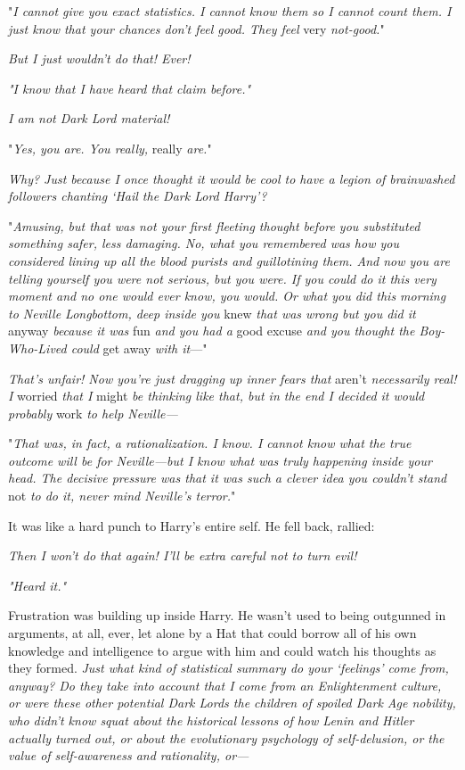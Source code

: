 "\emph{I cannot give you exact statistics. I cannot know them so I cannot count
them. I just know that your chances don't feel good. They feel} very \emph{
not-good.}"

\emph{But I just wouldn't do that! Ever!}

\emph{"I know that I have heard that claim before."}

\emph{I am not Dark Lord material!}

"\emph{Yes, you are. You really,} really \emph{are.}"

\emph{Why? Just because I once thought it would be cool to have a legion of
brainwashed followers chanting `Hail the Dark Lord Harry'?}

"\emph{Amusing, but that was not your first fleeting thought before you
substituted something safer, less damaging. No, what you remembered was how you
considered lining up all the blood purists and guillotining them. And now you
are telling yourself you were not serious, but you were. If you could do it
this very moment and no one would ever know, you would. Or what you did this
morning to Neville Longbottom, deep inside you} knew \emph{that was wrong but
you did it} anyway \emph{because it was} fun \emph{and you had a} good
excuse \emph{and you thought the Boy-Who-Lived could} get away \emph{with
it}\mbox{---}"

\emph{That's unfair! Now you're just dragging up inner fears that} aren't \emph{
necessarily real! I} worried \emph{that I} might \emph{be thinking like that,
but in the end I decided it would probably} work \emph{to help Neville---}

"\emph{That was, in fact, a rationalization. I know. I cannot know what the
true outcome will be for Neville---but I know what was truly happening inside
your head. The decisive pressure was that it was such a clever idea you
couldn't stand} not \emph{to do it, never mind Neville's terror.}"

It was like a hard punch to Harry's entire self. He fell back, rallied:

\emph{Then I won't do that again! I'll be extra careful not to turn evil!}

\emph{"Heard it."}

Frustration was building up inside Harry. He wasn't used to being outgunned in
arguments, at all, ever, let alone by a Hat that could borrow all of his own
knowledge and intelligence to argue with him and could watch his thoughts as
they formed. \emph{Just what kind of statistical summary do your `feelings'
come from, anyway? Do they take into account that I come from an Enlightenment
culture, or were these other potential Dark Lords the children of spoiled Dark
Age nobility, who didn't know squat about the historical lessons of how Lenin
and Hitler actually turned out, or about the evolutionary psychology of
self-delusion, or the value of self-awareness and rationality, or---}

